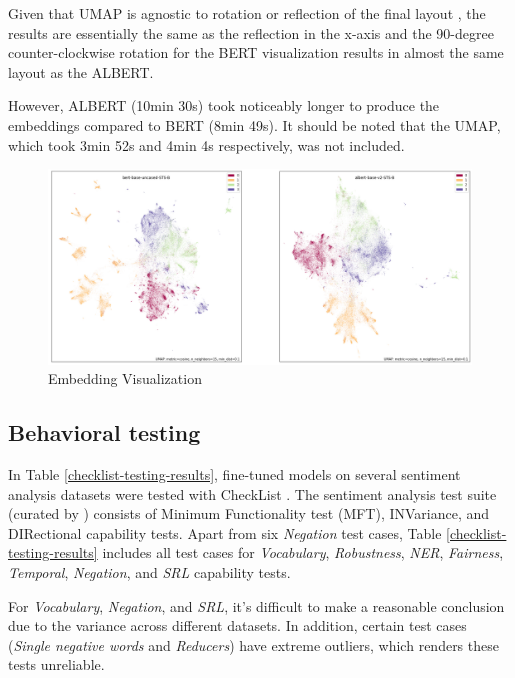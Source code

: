 \documentclass{article}
\begin{document}
Given that UMAP is agnostic to rotation or reflection of the final layout \cite{McInnes2018UMAPUM}, the results are essentially the same as the reflection in the x-axis and the 90-degree counter-clockwise rotation for the BERT visualization results in almost the same layout as the ALBERT. 

However, ALBERT (10min 30s) took noticeably longer to produce the embeddings compared to BERT (8min 49s). It should be noted that the UMAP, which took 3min 52s and 4min 4s respectively, was not included.

\clearpage

\begin{figure}[!htbp]
    \centering
    \includegraphics[width=\textwidth]{sts-b-ag-news}
    \caption{Embedding Visualization}
    \label{fig:sts-b-ag-news}
\end{figure}

\subsection{Behavioral testing}

In Table \ref{checklist-testing-results}, fine-tuned models on several sentiment analysis datasets were tested with CheckList \cite{Ribeiro2020BeyondAB}. The sentiment analysis test suite (curated by \citet{Ribeiro2020BeyondAB}) consists of Minimum Functionality test (MFT), INVariance, and DIRectional capability tests. Apart from six \emph{Negation} test cases, Table \ref{checklist-testing-results} includes all test cases for \emph{Vocabulary}, \emph{Robustness}, \emph{NER}, \emph{Fairness}, \emph{Temporal}, \emph{Negation}, and \emph{SRL} capability tests.

For \emph{Vocabulary}, \emph{Negation}, and \emph{SRL}, it's difficult to make a reasonable conclusion due to the variance across different datasets. In addition, certain test cases (\emph{Single negative words} and \emph{Reducers}) have extreme outliers, which renders these tests unreliable.
\end{document}
